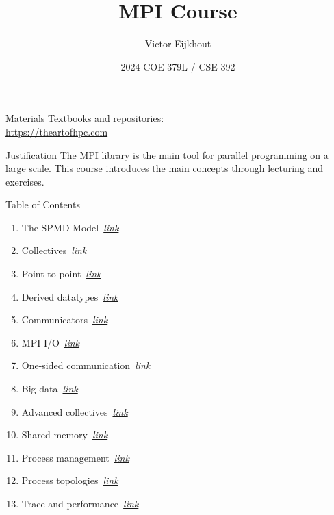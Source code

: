\documentclass[10pt]{beamer}
\begin{document}


\author[Eijkhout]{Victor Eijkhout}
\date[2024]{2024 COE 379L / CSE 392}
\title[MPI]{MPI Course}
\maketitle



\begin{frame}[containsverbatim]{Materials}
    Textbooks and repositories:\\
    \url{https://theartofhpc.com}
\end{frame}

\begin{frame}{Justification}
  The MPI library is the main tool
  for parallel programming on a large scale.
  This course introduces the main concepts
  through lecturing and exercises.
\end{frame}

\begin{frame}{Table of Contents}
  \begin{enumerate}
  \item The SPMD Model~\hyperlink{sec:spmd}{\textsl{link}}
  \item Collectives~\hyperlink{sec:collectives}{\textsl{link}}
  \item Point-to-point~\hyperlink{sec:ptp}{\textsl{link}}
  \item Derived datatypes~\hyperlink{sec:derived}{\textsl{link}}
  \item Communicators~\hyperlink{sec:comm}{\textsl{link}}
  \item MPI I/O~\hyperlink{sec:io}{\textsl{link}}
  \item One-sided communication~\hyperlink{sec:1side}{\textsl{link}}
  \item Big data~\hyperlink{sec:bigdata}{\textsl{link}}
  \item Advanced collectives~\hyperlink{sec:coll2}{\textsl{link}}
  \item Shared memory~\hyperlink{sec:shared}{\textsl{link}}
  \item Process management~\hyperlink{sec:process}{\textsl{link}}
  \item Process topologies~\hyperlink{sec:topo}{\textsl{link}}
  \item Trace and performance~\hyperlink{sec:trace}{\textsl{link}}
  \end{enumerate}
\end{frame}
\end{document}

